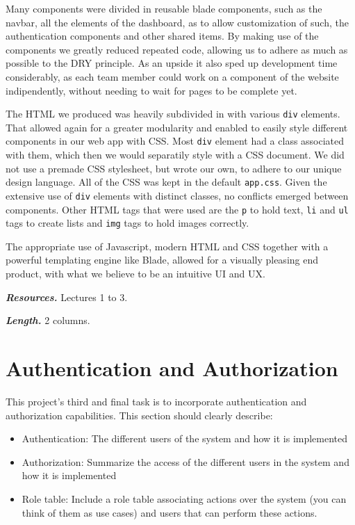 \documentclass[letterpaper,twocolumn]{article}
\newcommand{\myparagraph}[1]{\vspace{0.1cm}\noindent \textbf{\textit{#1.}}}
\begin{document}
Many components were divided in reusable blade components, such as the navbar, all the elements of the dashboard, as to allow customization of such, 
the authentication components and other shared items. By making use of the components we greatly reduced repeated code, allowing us to adhere as much as possible 
to the DRY \cite{dry} principle. As an upside it also sped up development time considerably, as each team member could work on a component of the website indipendently, 
without needing to wait for pages to be complete yet. 

The HTML we produced was heavily subdivided in with various \texttt{div} elements. That allowed again for a greater modularity and enabled to easily style 
different components in our web app with CSS. Most \texttt{div} element had a class associated with them, which then we would separatily style with a CSS document. 
We did not use a premade CSS stylesheet, but wrote our own, to adhere to our unique design language. All of the CSS was kept in the default \texttt{app.css}. Given the extensive use
of \texttt{div} elements with distinct classes, no conflicts emerged between components. 
Other HTML tags that were used are the \texttt{p} to hold text, \texttt{li} and \texttt{ul} tags to create lists and \texttt{img} tags to hold images correctly. 

The appropriate use of Javascript, modern HTML and CSS together with a powerful templating engine like Blade, allowed for a visually pleasing end product,
with what we believe to be an intuitive UI and UX. 

\myparagraph{Resources} Lectures 1 to 3.

\myparagraph{Length} 2 columns.



\section{Authentication and Authorization}

This project's third and final task is to incorporate authentication and authorization capabilities.
This section should clearly describe:

\begin{itemize}
    \item Authentication: The different users of the system and how it is implemented
    \item Authorization: Summarize the access of the different users in the system and how it is implemented
    \item Role table: Include a role table associating actions over the system (you can think of them as use cases) and users that can perform these actions.
\end{itemize}
\end{document}
